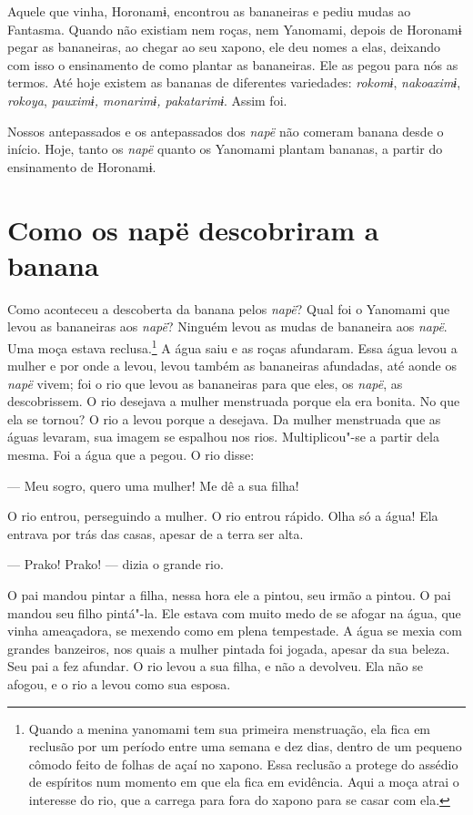 Aquele que vinha, Horonamɨ, encontrou as bananeiras e pediu mudas ao
Fantasma. Quando não existiam nem roças, nem Yanomami, depois de
Horonamɨ pegar as bananeiras, ao chegar ao seu xapono, ele deu nomes a
elas, deixando com isso o ensinamento de como plantar as bananeiras. Ele
as pegou para nós as termos. Até hoje existem as bananas de diferentes
variedades: \emph{rokomɨ}, \emph{nakoaximɨ}, \emph{rokoya}, \emph{pauximɨ,
monarimɨ, pakatarimɨ}. Assim foi. 

Nossos antepassados e os antepassados dos \emph{napë} não comeram banana
desde o início. Hoje, tanto os \emph{napë} quanto os Yanomami plantam
bananas, a partir do ensinamento de Horonamɨ.

 
\section{Como os napë descobriram a banana}

Como aconteceu a descoberta da banana pelos \emph{napë}? Qual foi o
Yanomami que levou as bananeiras aos \emph{napë}? Ninguém levou as mudas
de bananeira aos \emph{napë}. Uma moça estava reclusa.\footnote{  Quando a menina yanomami tem sua primeira menstruação, ela fica em
reclusão por um período entre uma semana e dez dias, dentro de um
pequeno cômodo feito de folhas de açaí no xapono. Essa reclusão a
protege do assédio de espíritos num momento em que ela fica em
evidência. Aqui a moça atrai o interesse do rio, que a carrega para fora
do xapono para se casar com ela.} A água saiu
e as roças afundaram. Essa água levou a mulher e por onde a levou, levou
também as bananeiras afundadas, até aonde os \emph{napë} vivem; foi o
rio que levou as bananeiras para que eles, os \emph{napë}, as
descobrissem. O rio desejava a mulher menstruada porque ela era bonita.
No que ela se tornou? O rio a levou porque a desejava. Da mulher
menstruada que as águas levaram, sua imagem se espalhou nos rios.
Multiplicou"-se a partir dela mesma. Foi a água que a pegou. O rio
disse: 

--- Meu sogro, quero uma mulher! Me dê a sua filha! 

O rio entrou, perseguindo a mulher. O rio entrou rápido. Olha só a água!
Ela entrava por trás das casas, apesar de a terra ser alta. 

--- Prako! Prako! --- dizia o grande rio. 

O pai mandou pintar a filha, nessa hora ele a pintou, seu irmão a
pintou. O pai mandou seu filho pintá"-la. Ele estava com muito medo de se
afogar na água, que vinha ameaçadora, se mexendo como em plena
tempestade. A água se mexia com grandes banzeiros, nos quais a mulher pintada foi
jogada, apesar da sua beleza. Seu pai a fez afundar. O rio levou a sua filha, e não a devolveu. Ela não se afogou, e o rio a
levou como sua esposa. 

